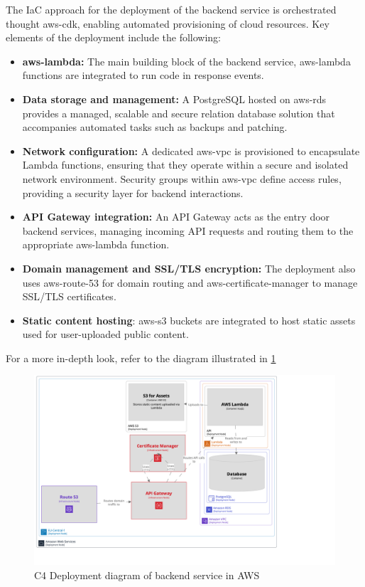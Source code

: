 The \ac{IaC} approach for the deployment of the backend service is orchestrated thought \gls{aws-cdk}, enabling automated provisioning of cloud resources.
Key elements of the deployment include the following:
\begin{itemize}
    \item \textbf{\gls{aws-lambda}:} The main building block of the backend service, \gls{aws-lambda} functions are integrated to run code in response events.
    \item \textbf{Data storage and management:} A PostgreSQL hosted on \gls{aws-rds} provides a managed, scalable and secure relation database solution that accompanies automated tasks such as backups and patching.
    \item \textbf{Network configuration:} A dedicated \gls{aws-vpc} is provisioned to encapsulate Lambda functions, ensuring that they operate within a secure and isolated network environment. Security groups within \gls{aws-vpc} define access rules, providing a security layer for backend interactions.
    \item \textbf{API Gateway integration:} An API Gateway acts as the entry door backend services, managing incoming API requests and routing them to the appropriate \gls{aws-lambda} function.
    \item \textbf{Domain management and \ac{SSL}/\ac{TLS} encryption:} The deployment also uses \gls{aws-route-53} for domain routing and \gls{aws-certificate-manager} to manage \ac{SSL}/\ac{TLS} certificates. 
    \item \textbf{Static content hosting}: \gls{aws-s3} buckets are integrated to host static assets used for user-uploaded public content.
\end{itemize}

For a more in-depth look, refer to the diagram illustrated in \ref{img06:fig_lambda}

\begin{figure}[H]\centering
\includegraphics[width=140mm]{img/chap06/fig_lambda.png}
\caption{C4 Deployment diagram of backend service in AWS}
\label{img06:fig_lambda}
\end{figure}


